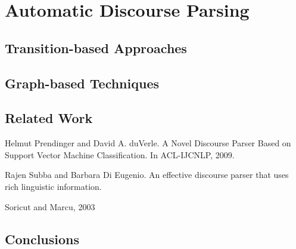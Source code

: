 \chapter{Automatic Discourse Parsing}
\section{Transition-based Approaches}
\section{Graph-based Techniques}
\section{Related Work}
Helmut Prendinger and David A. duVerle. A Novel Discourse Parser Based
on Support Vector Machine Classification. In ACL-IJCNLP, 2009.

Rajen Subba and Barbara Di Eugenio. An effective discourse parser that
uses rich linguistic information.

Soricut and Marcu, 2003
\citet{Joty:12}
\citet{Muller:12}
\citet{Luong:13}
\citet{Joty:13}
\citet{Joty:14}
\citet{Heilman:15}
\section{Conclusions}
